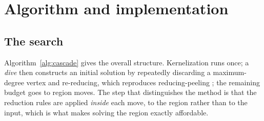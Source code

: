 \documentclass[review,authoryear,11pt]{elsarticle}
\theoremstyle{definition}
\begin{document}
\section{Algorithm and implementation}
\label{sec:algorithm}

\subsection{The search}\label{sec:search}

Algorithm~\ref{alg:cascade} gives the overall structure. Kernelization runs
once; a \emph{dive} then constructs an initial solution by repeatedly discarding
a maximum-degree vertex and re-reducing, which reproduces reducing-peeling
\citep{chang2017}; the remaining budget goes to region moves. The step that
distinguishes the method is that the reduction rules are applied \emph{inside}
each move, to the region rather than to the input, which is what makes solving the
region exactly affordable.
\end{document}
